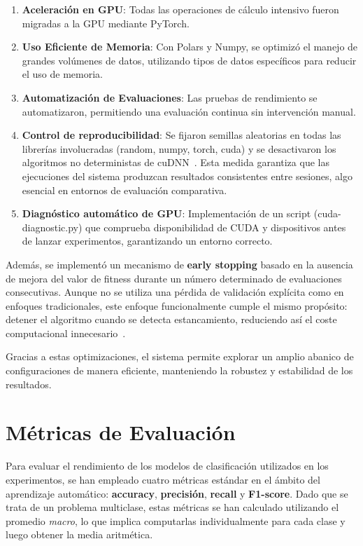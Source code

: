 \begin{enumerate}
      \item \textbf{Aceleración en GPU}: Todas las operaciones de cálculo intensivo fueron migradas a la GPU mediante
            PyTorch.
      \item \textbf{Uso Eficiente de Memoria}: Con Polars y Numpy, se optimizó el manejo de grandes volúmenes de datos,
            utilizando tipos de datos específicos para reducir el uso de memoria.
      \item \textbf{Automatización de Evaluaciones}: Las pruebas de rendimiento se automatizaron, permitiendo una
            evaluación continua sin intervención manual.
      \item \textbf{Control de reproducibilidad}: Se fijaron semillas aleatorias en todas las librerías involucradas
            (random, numpy, torch, cuda) y se desactivaron los algoritmos no deterministas de cuDNN~\cite{CuBLASDeterministicAlgorithms}.
            Esta medida garantiza que las ejecuciones del sistema produzcan resultados consistentes entre sesiones,
            algo esencial en entornos de evaluación comparativa.
      \item \textbf{Diagnóstico automático de GPU}: Implementación de un script (cuda-diagnostic.py) que comprueba disponibilidad
            de CUDA y dispositivos antes de lanzar experimentos, garantizando un entorno correcto.
\end{enumerate}

Además, se implementó un mecanismo de \textbf{early stopping} basado en la ausencia de mejora del valor de fitness durante
un número determinado de evaluaciones consecutivas.
Aunque no se utiliza una pérdida de validación explícita como en enfoques tradicionales, este enfoque funcionalmente cumple el mismo propósito:
detener el algoritmo cuando se detecta estancamiento, reduciendo así el coste computacional innecesario~\cite{EarlyStoppingDiscussion2024}.

Gracias a estas optimizaciones, el sistema permite explorar un amplio abanico de configuraciones de manera eficiente, manteniendo la robustez y estabilidad de los resultados.


\section{Métricas de Evaluación}\label{sec:metricas-evaluacion}
Para evaluar el rendimiento de los modelos de clasificación utilizados en los experimentos,
se han empleado cuatro métricas estándar en el ámbito del aprendizaje automático: \textbf{accuracy}, \textbf{precisión}, \textbf{recall} y \textbf{F1-score}.
Dado que se trata de un problema multiclase, estas métricas se han calculado utilizando el promedio \textit{macro},
lo que implica computarlas individualmente para cada clase y luego obtener la media aritmética.

